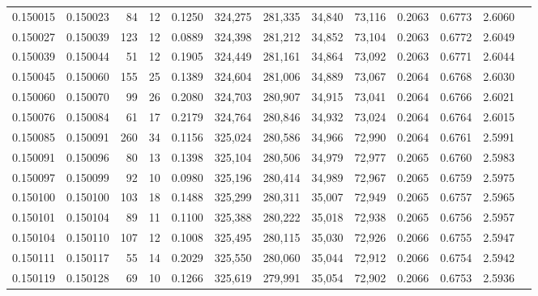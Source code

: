 \begin{tabular}{rrrrrrrrrrrrr}
0.150015 & 0.150023 &    84 &  12 &                                     0.1250 & 324,275 & 281,335 &  34,840 &  73,116 & 0.2063 & 0.6773 & 2.6060 \\
0.150027 & 0.150039 &   123 &  12 &                                     0.0889 & 324,398 & 281,212 &  34,852 &  73,104 & 0.2063 & 0.6772 & 2.6049 \\
0.150039 & 0.150044 &    51 &  12 &                                     0.1905 & 324,449 & 281,161 &  34,864 &  73,092 & 0.2063 & 0.6771 & 2.6044 \\
0.150045 & 0.150060 &   155 &  25 &                                     0.1389 & 324,604 & 281,006 &  34,889 &  73,067 & 0.2064 & 0.6768 & 2.6030 \\
0.150060 & 0.150070 &    99 &  26 &                                     0.2080 & 324,703 & 280,907 &  34,915 &  73,041 & 0.2064 & 0.6766 & 2.6021 \\
0.150076 & 0.150084 &    61 &  17 &                                     0.2179 & 324,764 & 280,846 &  34,932 &  73,024 & 0.2064 & 0.6764 & 2.6015 \\
0.150085 & 0.150091 &   260 &  34 &                                     0.1156 & 325,024 & 280,586 &  34,966 &  72,990 & 0.2064 & 0.6761 & 2.5991 \\
0.150091 & 0.150096 &    80 &  13 &                                     0.1398 & 325,104 & 280,506 &  34,979 &  72,977 & 0.2065 & 0.6760 & 2.5983 \\
0.150097 & 0.150099 &    92 &  10 &                                     0.0980 & 325,196 & 280,414 &  34,989 &  72,967 & 0.2065 & 0.6759 & 2.5975 \\
0.150100 & 0.150100 &   103 &  18 &                                     0.1488 & 325,299 & 280,311 &  35,007 &  72,949 & 0.2065 & 0.6757 & 2.5965 \\
0.150101 & 0.150104 &    89 &  11 &                                     0.1100 & 325,388 & 280,222 &  35,018 &  72,938 & 0.2065 & 0.6756 & 2.5957 \\
0.150104 & 0.150110 &   107 &  12 &                                     0.1008 & 325,495 & 280,115 &  35,030 &  72,926 & 0.2066 & 0.6755 & 2.5947 \\
0.150111 & 0.150117 &    55 &  14 &                                     0.2029 & 325,550 & 280,060 &  35,044 &  72,912 & 0.2066 & 0.6754 & 2.5942 \\
0.150119 & 0.150128 &    69 &  10 &                                     0.1266 & 325,619 & 279,991 &  35,054 &  72,902 & 0.2066 & 0.6753 & 2.5936 \\

\end{tabular}
